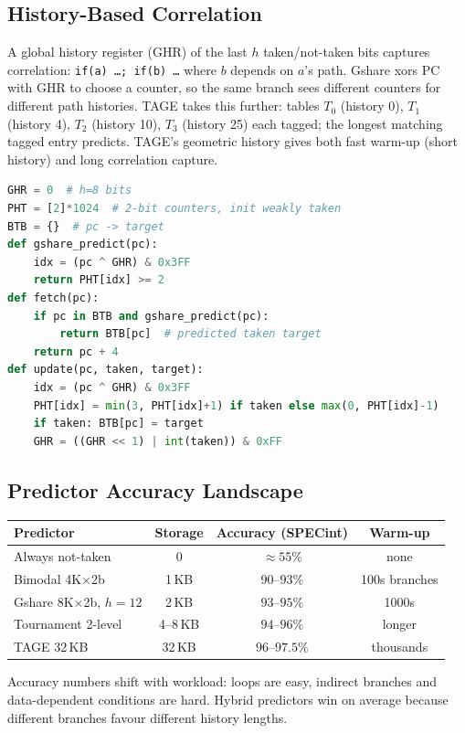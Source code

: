 \subsection{History-Based Correlation}
A global history register (GHR) of the last $h$ taken/not-taken bits captures correlation: \texttt{if(a) \dots; if(b) \dots} where $b$ depends on $a$'s path. Gshare xors PC with GHR to choose a counter, so the same branch sees different counters for different path histories. TAGE takes this further: tables $T_0$ (history 0), $T_1$ (history 4), $T_2$ (history 10), $T_3$ (history 25) each tagged; the longest matching tagged entry predicts. TAGE's geometric history gives both fast warm-up (short history) and long correlation capture.

\begin{lstlisting}[language=Python, caption={Gshare index and BTB lookup (sketch)}, label={lst:gshare}]
GHR = 0  # h=8 bits
PHT = [2]*1024  # 2-bit counters, init weakly taken
BTB = {}  # pc -> target
def gshare_predict(pc):
    idx = (pc ^ GHR) & 0x3FF
    return PHT[idx] >= 2
def fetch(pc):
    if pc in BTB and gshare_predict(pc):
        return BTB[pc]  # predicted taken target
    return pc + 4
def update(pc, taken, target):
    idx = (pc ^ GHR) & 0x3FF
    PHT[idx] = min(3, PHT[idx]+1) if taken else max(0, PHT[idx]-1)
    if taken: BTB[pc] = target
    GHR = ((GHR << 1) | int(taken)) & 0xFF
\end{lstlisting}

\subsection{Predictor Accuracy Landscape}
\begin{center}
\begin{tabular}{lccc}
\toprule Predictor & Storage & Accuracy (SPECint) & Warm-up \\ \midrule
Always not-taken & 0 & $ \approx 55\%$ & none \\
Bimodal 4K$\times$2b & 1\,KB & $90$--$93\%$ & 100s branches \\
Gshare 8K$\times$2b, $h=12$ & 2\,KB & $93$--$95\%$ & 1000s \\
Tournament 2-level & 4--8\,KB & $94$--$96\%$ & longer \\
TAGE 32\,KB & 32\,KB & $96$--$97.5\%$ & thousands \\ \bottomrule
\end{tabular}
\end{center}
Accuracy numbers shift with workload: loops are easy, indirect branches and data-dependent conditions are hard. Hybrid predictors win on average because different branches favour different history lengths.

